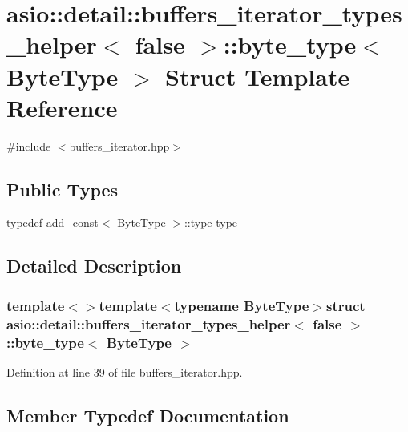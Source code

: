 \hypertarget{structasio_1_1detail_1_1buffers__iterator__types__helper_3_01false_01_4_1_1byte__type}{}\section{asio\+:\+:detail\+:\+:buffers\+\_\+iterator\+\_\+types\+\_\+helper$<$ false $>$\+:\+:byte\+\_\+type$<$ Byte\+Type $>$ Struct Template Reference}
\label{structasio_1_1detail_1_1buffers__iterator__types__helper_3_01false_01_4_1_1byte__type}


{\ttfamily \#include $<$buffers\+\_\+iterator.\+hpp$>$}

\subsection*{Public Types}
\begin{DoxyCompactItemize}
\item 
typedef add\+\_\+const$<$ Byte\+Type $>$\+::\hyperlink{structasio_1_1detail_1_1buffers__iterator__types__helper_3_01false_01_4_1_1byte__type_abb2587843440c828841ab928e6b319da}{type} \hyperlink{structasio_1_1detail_1_1buffers__iterator__types__helper_3_01false_01_4_1_1byte__type_abb2587843440c828841ab928e6b319da}{type}
\end{DoxyCompactItemize}


\subsection{Detailed Description}
\subsubsection*{template$<$$>$template$<$typename Byte\+Type$>$struct asio\+::detail\+::buffers\+\_\+iterator\+\_\+types\+\_\+helper$<$ false $>$\+::byte\+\_\+type$<$ Byte\+Type $>$}



Definition at line 39 of file buffers\+\_\+iterator.\+hpp.



\subsection{Member Typedef Documentation}
\hypertarget{structasio_1_1detail_1_1buffers__iterator__types__helper_3_01false_01_4_1_1byte__type_abb2587843440c828841ab928e6b319da}{}
